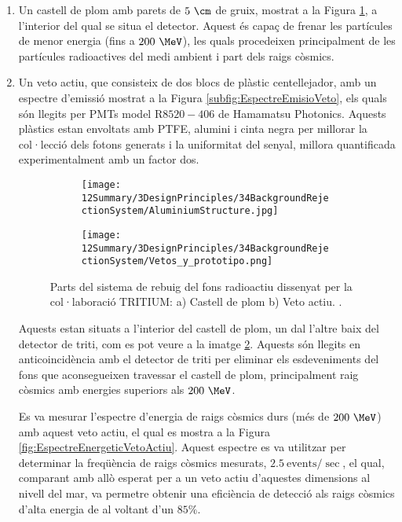 \begin{enumerate}

\item{} Un castell de plom amb parets de $5~\cm$ de gruix, mostrat a la Figura \ref{subfig:CastellPlom}, a l'interior del qual se situa el detector. Aquest és capaç de frenar les partícules de menor energia (fins a $200~\MeV$), les quals procedeixen principalment de les partícules radioactives del medi ambient i part dels raigs còsmics.

\item{} Un veto actiu, que consisteix de dos blocs de plàstic centellejador, amb un espectre d'emissió mostrat a la Figura \ref{subfig:EspectreEmisioVeto}, els quals són llegits per PMTs model R$8520-406$ de Hamamatsu Photonics. Aquests plàstics estan envoltats amb PTFE, alumini i cinta negra per millorar la col·lecció dels fotons generats i la uniformitat del senyal, millora quantificada experimentalment amb un factor dos.

\begin{figure}
\centering
    \begin{subfigure}[b]{0.7\textwidth}
    \centering
    \texttt{[image: 12Summary/3DesignPrinciples/34BackgroundRejectionSystem/AluminiumStructure.jpg]}  
        \caption{}\label{subfig:CastellPlom}
    \end{subfigure}
    \hfill
    \begin{subfigure}[b]{0.7\textwidth}
    \centering
    \texttt{[image: 12Summary/3DesignPrinciples/34BackgroundRejectionSystem/Vetos\_y\_prototipo.png]}  
    \caption{\label{subfig:VetoActiu}}
    \end{subfigure}
\caption{Parts del sistema de rebuig del fons radioactiu dissenyat per la col·laboració TRITIUM: a) Castell de plom b) Veto actiu. \label{fig:SistemaRebuigFonsRadioactiu}.}
\end{figure}

Aquests estan situats a l'interior del castell de plom, un dal l'altre baix del detector de triti, com es pot veure a la imatge \ref{subfig:VetoActiu}. Aquests són llegits en anticoincidència amb el detector de triti per eliminar els esdeveniments del fons que aconsegueixen travessar el castell de plom, principalment raig còsmics amb energies superiors als $200~\MeV$. 

Es va mesurar l'espectre d'energia de raigs còsmics durs (més de $200~\MeV$) amb aquest veto actiu, el qual es mostra a la Figura \ref{fig:EspectreEnergeticVetoActiu}. Aquest espectre es va utilitzar per determinar la freqüència de raigs còsmics mesurats, $2.5~\text{events}/\sec$, el qual, comparant amb allò esperat per a un veto actiu d'aquestes dimensions al nivell del mar, va permetre obtenir una eficiència de detecció als raigs còsmics d'alta energia de al voltant d'un $85\%$.


\end{enumerate}
